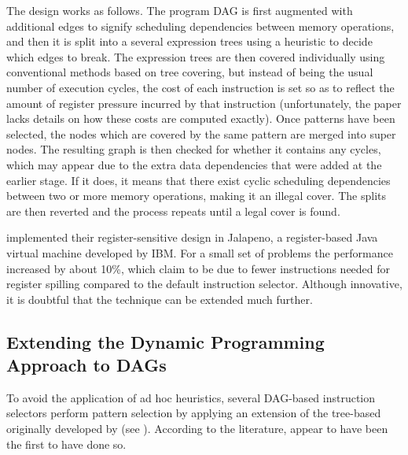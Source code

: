 The design works as follows.
%
The \gls{program DAG} is first augmented with
additional \glspl{edge} to signify scheduling dependencies between memory
operations, and then it is split into a several \glspl{expression tree} using a
heuristic to decide which \glspl{edge} to break.
%
The \glspl{expression tree} are
then covered individually using conventional methods based on \gls{tree
  covering}, but instead of being the usual number of execution cycles, the cost
of each \gls{instruction} is set so as to reflect the amount of \gls{register
  pressure} incurred by that instruction (unfortunately, the paper lacks details
on how these costs are computed exactly).
%
Once \glspl{pattern} have been
selected, the \glspl{node} which are covered by the same \gls{pattern} are
merged into \glspl{super node}.
%
The resulting \gls{graph} is then checked for
whether it contains any \glspl{cycle}, which may appear due to the extra data
dependencies that were added at the earlier stage.
%
If it does, it means that
there exist cyclic scheduling dependencies between two or more memory
operations, making it an illegal cover.
%
The splits are then reverted and the
process repeats until a legal cover is found.

\citeauthor{Sarkar2001} implemented their \gls{register}-sensitive design in
\gls{Jalapeno}, a \gls{register}-based \gls{Java} virtual machine developed by
\gls{IBM}.
%
For a small set of problems the performance increased by about 10\%,
which \citeauthor{Sarkar2001} claim to be due to fewer \glspl{instruction}
needed for \gls{register spilling} compared to the default \gls{instruction
  selector}.
%
Although innovative, it is doubtful that the technique can be
extended much further.


\subsection{Extending the Dynamic Programming Approach to DAGs}

To avoid the application of ad hoc heuristics, several \gls{DAG}-based
\glspl{instruction selector} perform \gls{pattern selection} by applying an
extension of the \gls{tree}-based \tDPalgorithm originally developed by
\textcite{Aho1976a} (see ).
%
According to the literature,
 appear to have been the
first to have done so.

